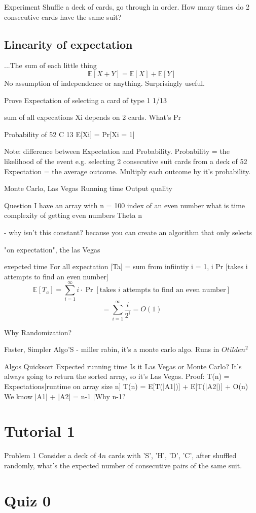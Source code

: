 \newcommand{\Expectation}{\mathbb{E}}


Experiment
Shuffle a deck of cards, go through in order. How many times do 2 consecutive cards have the same suit?

\subsection{Linearity of expectation}
...The sum of each little thing
\[\Expectation [ X + Y ] = \Expectation[X] + \Expectation[Y]\]
No assumption of independence or anything. Surprisingly useful. 

Prove
Expectation of selecting a card of type 1
1/13

sum of all expecations 
Xi depends on 2 cards. What's Pr

Probability of 
52 C 13
E[Xi] = Pr[Xi = 1] 


Note: difference between Expectation and Probability.
Probability = the likelihood of the event e.g. selecting 2 consecutive suit cards from a deck of 52
Expectation = the average outcome. Multiply each outcome by it's probability. 


Monte Carlo, Las Vegas
Running time
Output quality



Question
I have an array with n = 100
index of an even number
what is time complexity of getting even numbers
Theta n

- why isn't this constant? because you can create an algorithm that only selects 

"on expectation", the las Vegas

exepcted time 
For all expectation [Ta] = sum from infiintiy i = 1, i Pr [takes i attempts to find an even number]
\[
    \Expectation[T_a] = \sum_{i=1}^{\infty} i \cdot \Pr[\text{takes $i$ attempts to find an even number}]
\]
\[
    = \sum_{i=1}^{\infty} \frac{i}{2^i} = O(1)    
\]


Why Randomization?


Faster, Simpler Algo'S
- miller rabin, it's a monte carlo algo. 
Runs in $O tilde n^2$



Algos
Quicksort
Expected running time 
Is it Las Vegas or Monte Carlo?
It's always going to return the sorted array, so it's Las Vegas.
Proof:
T(n) = Expectations[runtime on array size n]
T(n) = E[T(|A1|)] + E[T(|A2|)] + O(n)
We know |A1| + |A2| = n-1 |Why n-1? 











\section{Tutorial 1}
Problem 1
Consider a deck of 4$n$ cards with 'S', 'H', 'D', 'C', after shuffled randomly, what's the expected number of consecutive pairs of the same suit.



\section{Quiz 0}
